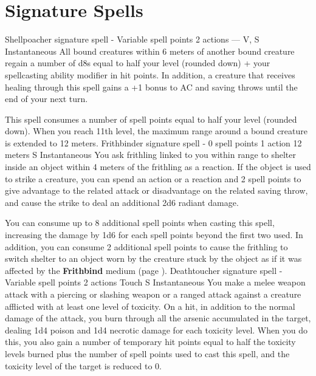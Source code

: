 \section{Signature Spells} \label{sec::signaturespells}
    {Shellpoacher signature spell - Variable spell points}
    {2 actions}
    {---}
    {V, S}
    {Instantaneous}
    All bound creatures within 6 meters of another bound creature regain a number of d8s equal to half your level (rounded down) + your spellcasting ability modifier in hit points.
    In addition, a creature that receives healing through this spell gains a +1 bonus to AC and saving throws until the end of your next turn.

    This spell consumes a number of spell points equal to half your level (rounded down).
    When you reach 11th level, the maximum range around a bound creature is extended to 12 meters.
    {Frithbinder signature spell - 0 spell points}
    {1 action}
    {12 meters}
    {S}
    {Instantaneous}
    You ask frithling linked to you within range to shelter inside an object within 4 meters of the frithling as a reaction.
    If the object is used to strike a creature, you can spend an action or a reaction and 2 spell points to give advantage to the related attack or disadvantage on the related saving throw, and cause the strike to deal an additional 2d6 radiant damage.

    You can consume up to 8 additional spell points when casting this spell, increasing the damage by 1d6 for each spell points beyond the first two used.
    In addition, you can consume 2 additional spell points to cause the frithling to switch shelter to an object worn by the creature stuck by the object as if it was affected by the \textbf{Frithbind} medium (page \pageref{medium::frithbind}).
    {Deathtoucher signature spell - Variable spell points}
    {2 actions}
    {Touch}
    {S}
    {Instantaneous}
    You make a melee weapon attack with a piercing or slashing weapon or a ranged attack against a creature afflicted with at least one level of toxicity.
    On a hit, in addition to the normal damage of the attack, you burn through all the arsenic accumulated in the target, dealing 1d4 poison and 1d4 necrotic damage for each toxicity level.
    When you do this, you also gain a number of temporary hit points equal to half the toxicity levels burned plus the number of spell points used to cast this spell, and the toxicity level of the target is reduced to 0.

